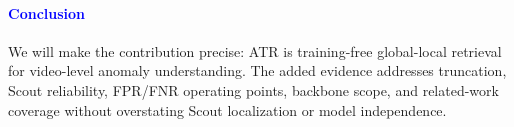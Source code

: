 \documentclass[10pt,twocolumn,letterpaper]{article}
\begin{document}
\paragraph{\textcolor{blue}{Conclusion}}
We will make the contribution precise: ATR is training-free global-local retrieval for video-level anomaly understanding. The added evidence addresses truncation, Scout reliability, FPR/FNR operating points, backbone scope, and related-work coverage without overstating Scout localization or model independence.
\end{document}
